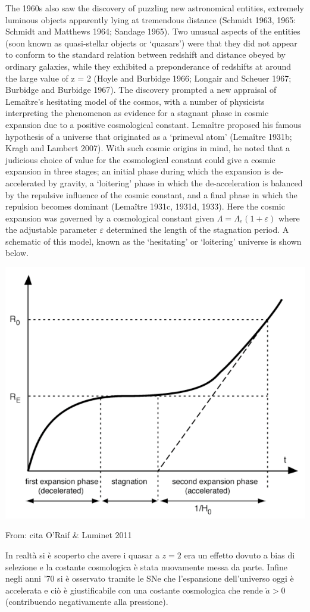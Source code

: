 \begin{definition}
    The 1960s also saw the discovery of puzzling new astronomical entities, extremely luminous
objects apparently lying at tremendous distance (Schmidt 1963, 1965: Schmidt and Matthews
1964; Sandage 1965). Two unusual aspects of the entities (soon known as quasi-stellar
objects or ‘quasars’) were that they did not appear to conform to the standard relation
between redshift and distance obeyed by ordinary galaxies, while they exhibited a
preponderance of redshifts at around the large value of z = 2 (Hoyle and Burbidge 1966;
Longair and Scheuer 1967; Burbidge and Burbidge 1967). The discovery prompted a new
appraisal of Lemaître’s hesitating model of the cosmos, with a number of
physicists interpreting the phenomenon as evidence for a stagnant phase in cosmic expansion
due to a positive cosmological constant.
Lemaître proposed his famous hypothesis of a universe that originated as a ‘primeval atom’ (Lemaître
1931b; Kragh and Lambert 2007). With such cosmic origins in mind, he noted that a
judicious choice of value for the cosmological constant could give a cosmic expansion in
three stages; an initial phase during which the expansion is de-accelerated by gravity, a
‘loitering’ phase in which the de-acceleration is balanced by the repulsive influence of the
cosmic constant, and a final phase in which the repulsion becomes dominant (Lemaître
1931c, 1931d, 1933). Here the cosmic expansion was governed by a cosmological constant
given $\Lambda=\Lambda_e (1+\varepsilon)$ where the adjustable parameter $\varepsilon$ determined the length of the stagnation period. A schematic of this model, known as the ‘hesitating’ or ‘loitering’ universe is shown below.

\includegraphics[width=.6\textwidth]{Pictures/2/Uhesitating.png}
\vspace*{0.5em}

From: cita O'Raif \& Luminet 2011
\end{definition}
\vspace*{0.5em}
In realtà si è scoperto che avere i quasar a $z=2$ era un effetto dovuto a bias di selezione e la costante cosmologica è stata nuovamente messa da parte. Infine negli anni '70 si è osservato tramite le SNe che l'espansione dell'universo oggi è accelerata e ciò è giustificabile con una costante cosmologica che rende $\ddot{a}>0$ (contribuendo negativamente alla pressione).



